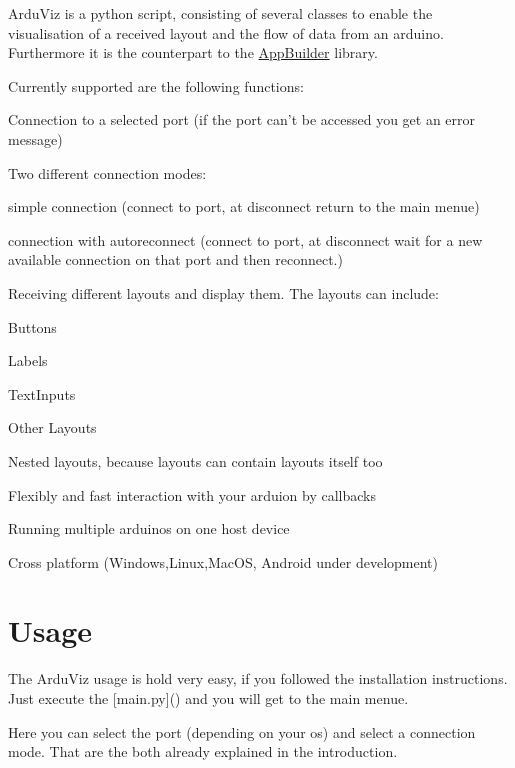 Ardu\+Viz is a python script, consisting of several classes to enable the visualisation of a received layout and the flow of data from an arduino. Furthermore it is the counterpart to the \hyperlink{class_app_builder}{App\+Builder} library.

Currently supported are the following functions\+:
\begin{DoxyItemize}
\item Connection to a selected port (if the port can't be accessed you get an error message)
\item Two different connection modes\+:
\begin{DoxyItemize}
\item simple connection (connect to port, at disconnect return to the main menue)
\item connection with autoreconnect (connect to port, at disconnect wait for a new available connection on that port and then reconnect.)
\end{DoxyItemize}
\item Receiving different layouts and display them. The layouts can include\+:
\begin{DoxyItemize}
\item Buttons
\item Labels
\item Text\+Inputs
\item Other Layouts
\end{DoxyItemize}
\item Nested layouts, because layouts can contain layouts itself too
\item Flexibly and fast interaction with your arduion by callbacks
\item Running multiple arduinos on one host device
\item Cross platform (Windows,Linux,Mac\+O\+S, Android under development)
\end{DoxyItemize}

\section*{Usage}

The Ardu\+Viz usage is hold very easy, if you followed the installation instructions. Just execute the \mbox{[}main.\+py\mbox{]}() and you will get to the main menue.



Here you can select the port (depending on your os) and select a connection mode. That are the both already explained in the introduction.


